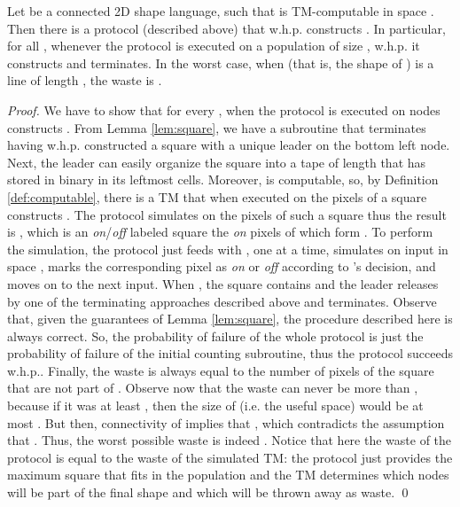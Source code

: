 \documentclass[oribibl, 11pt]{llncs}
\begin{document}
\begin{theorem}
Let  be a connected 2D shape language, such that  is TM-computable in space . Then there is a protocol (described above) that w.h.p. constructs . In particular, for all , whenever the protocol is executed on a population of size , w.h.p. it constructs  and terminates. In the worst case, when  (that is, the shape of ) is a line of length , the waste is .
\end{theorem}
\begin{proof}
We have to show that for every , when the protocol is executed on  nodes constructs . From Lemma \ref{lem:square}, we have a subroutine that terminates having w.h.p. constructed a  square with a unique leader on the bottom left node. Next, the leader can easily organize the square into a tape of length  that has  stored in binary in its leftmost cells. Moreover,  is computable, so, by Definition \ref{def:computable}, there is a TM  that when executed on the pixels of a  square constructs . The protocol simulates  on the pixels of such a  square thus the result is , which is an \emph{on}/\emph{off} labeled  square the \emph{on} pixels of which form . To perform the simulation, the protocol just feeds  with , one at a time, simulates  on input  in space , marks the corresponding pixel as \emph{on} or \emph{off} according to 's decision, and moves on to the next input. When , the square contains  and the leader releases  by one of the terminating approaches described above and terminates. Observe that, given the guarantees of Lemma \ref{lem:square}, the procedure described here is always correct. So, the probability of failure of the whole protocol is just the probability of failure of the initial counting subroutine, thus the protocol succeeds w.h.p.. Finally, the waste is always equal to the number of pixels of the  square that are not part of . Observe now that the waste can never be more than , because if it was at least , then the size of  (i.e. the useful space) would be at most . But then, connectivity of  implies that , which contradicts the assumption that . Thus, the worst possible waste is indeed . Notice that here the waste of the protocol is equal to the waste of the simulated TM: the protocol just provides the maximum square that fits in the population and the TM determines which nodes will be part of the final shape and which will be thrown away as waste.
\qed
\end{proof}
\end{document}
